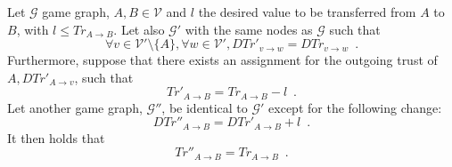 {}
\begin{theorem}
\label{riskinv}
   Let $\mathcal{G}$ game graph, $A, B \in \mathcal{V}$ and $l$ the desired value to be transferred from $A$ to $B$,
   with $l \leq Tr_{A \rightarrow B}$. Let also $\mathcal{G}'$ with the same nodes as $\mathcal{G}$ such that
   \begin{equation*}
      \forall v \in \mathcal{V}' \setminus \{A\}, \forall w \in \mathcal{V}', DTr'_{v \rightarrow w} =
      DTr_{v \rightarrow w} \enspace.
   \end{equation*}
   Furthermore, suppose that there exists an assignment for the outgoing trust of $A, DTr'_{A \rightarrow v}$, such that
   \begin{equation}
   \label{primetrust}
      Tr'_{A \rightarrow B} = Tr_{A \rightarrow B} - l \enspace.
   \end{equation}
   Let another game graph, $\mathcal{G}''$, be identical to $\mathcal{G}'$ except for the following change:
   \begin{equation*}
      DTr''_{A \rightarrow B} = DTr'_{A \rightarrow B} + l \enspace.
   \end{equation*}
   It then holds that
   \begin{equation*}
      Tr''_{A \rightarrow B} = Tr_{A \rightarrow B} \enspace.
   \end{equation*}
\end{theorem}
